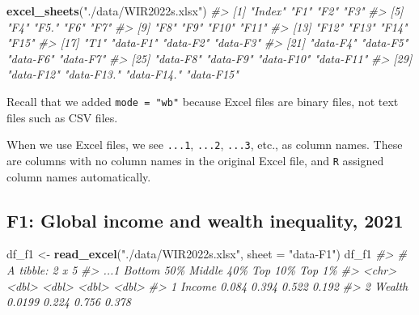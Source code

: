 \documentclass[
  xelatex, ja=standard]{bxjsbook}
\newenvironment{Shaded}{\begin{snugshade}}{\end{snugshade}}
\newcommand{\AttributeTok}[1]{\textcolor[rgb]{0.13,0.29,0.53}{#1}}
\newcommand{\CommentTok}[1]{\textcolor[rgb]{0.56,0.35,0.01}{\textit{#1}}}
\newcommand{\FunctionTok}[1]{\textcolor[rgb]{0.13,0.29,0.53}{\textbf{#1}}}
\newcommand{\NormalTok}[1]{#1}
\newcommand{\OtherTok}[1]{\textcolor[rgb]{0.56,0.35,0.01}{#1}}
\newcommand{\StringTok}[1]{\textcolor[rgb]{0.31,0.60,0.02}{#1}}
\theoremstyle{definition}
\theoremstyle{definition}
\theoremstyle{definition}
\theoremstyle{definition}
\theoremstyle{remark}
\begin{document}
\begin{Shaded}
\begin{Highlighting}[]
\FunctionTok{excel\_sheets}\NormalTok{(}\StringTok{"./data/WIR2022s.xlsx"}\NormalTok{)}
\CommentTok{\#\textgreater{}  [1] "Index"     "F1"        "F2"        "F3"       }
\CommentTok{\#\textgreater{}  [5] "F4"        "F5."       "F6"        "F7"       }
\CommentTok{\#\textgreater{}  [9] "F8"        "F9"        "F10"       "F11"      }
\CommentTok{\#\textgreater{} [13] "F12"       "F13"       "F14"       "F15"      }
\CommentTok{\#\textgreater{} [17] "T1"        "data{-}F1"   "data{-}F2"   "data{-}F3"  }
\CommentTok{\#\textgreater{} [21] "data{-}F4"   "data{-}F5"   "data{-}F6"   "data{-}F7"  }
\CommentTok{\#\textgreater{} [25] "data{-}F8"   "data{-}F9"   "data{-}F10"  "data{-}F11" }
\CommentTok{\#\textgreater{} [29] "data{-}F12"  "data{-}F13." "data{-}F14." "data{-}F15"}
\end{Highlighting}
\end{Shaded}

Recall that we added \texttt{mode\ =\ "wb"} because Excel files are binary files, not text files such as CSV files.

When we use Excel files, we see \texttt{...1}, \texttt{...2}, \texttt{...3}, etc., as column names. These are columns with no column names in the original Excel file, and \texttt{R} assigned column names automatically.

\hypertarget{f1-global-income-and-wealth-inequality-2021}{%
\subsection{F1: Global income and wealth inequality, 2021}\label{f1-global-income-and-wealth-inequality-2021}}

\begin{Shaded}
\begin{Highlighting}[]
\NormalTok{df\_f1 }\OtherTok{\textless{}{-}} \FunctionTok{read\_excel}\NormalTok{(}\StringTok{"./data/WIR2022s.xlsx"}\NormalTok{, }\AttributeTok{sheet =} \StringTok{"data{-}F1"}\NormalTok{)}
\NormalTok{df\_f1}
\CommentTok{\#\textgreater{} \# A tibble: 2 x 5}
\CommentTok{\#\textgreater{}   ...1   \textasciigrave{}Bottom 50\%\textasciigrave{} \textasciigrave{}Middle 40\%\textasciigrave{} \textasciigrave{}Top 10\%\textasciigrave{} \textasciigrave{}Top 1\%\textasciigrave{}}
\CommentTok{\#\textgreater{}   \textless{}chr\textgreater{}         \textless{}dbl\textgreater{}        \textless{}dbl\textgreater{}     \textless{}dbl\textgreater{}    \textless{}dbl\textgreater{}}
\CommentTok{\#\textgreater{} 1 Income       0.084         0.394     0.522    0.192}
\CommentTok{\#\textgreater{} 2 Wealth       0.0199        0.224     0.756    0.378}
\end{Highlighting}
\end{Shaded}
\end{document}
